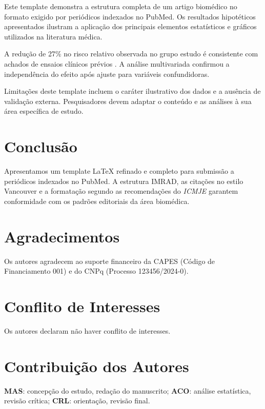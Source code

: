 \documentclass[12pt,a4paper]{article}
\newcommand{\ICMJE}{\textit{ICMJE}}
\begin{document}
Este template demonstra a estrutura completa de um artigo
biom\'edico no formato exigido por peri\'odicos indexados no
PubMed. Os resultados hipot\'eticos apresentados ilustram a
aplica\c{c}\~ao dos principais elementos estat\'isticos e
gr\'aficos utilizados na literatura m\'edica.

A redu\c{c}\~ao de 27\% no risco relativo observada no grupo
estudo \'e consistente com achados de ensaios cl\'inicos
pr\'evios \cite{Topol2024Preventive}. A an\'alise multivariada
confirmou a independ\^encia do efeito ap\'os ajuste para
vari\'aveis confundidoras.

Limita\c{c}\~oes deste template incluem o car\'ater ilustrativo
dos dados e a aus\^encia de valida\c{c}\~ao externa.
Pesquisadores devem adaptar o conte\'udo e as an\'alises
\`a sua \'area espec\'ifica de estudo.

\section{Conclus\~ao}
\label{sec:conclusao}

Apresentamos um template \LaTeX{} refinado e completo para
submiss\~ao a peri\'odicos indexados no PubMed. A estrutura
IMRAD, as cita\c{c}\~oes no estilo Vancouver e a formata\c{c}\~ao
segundo as recomenda\c{c}\~oes do \ICMJE{} garantem conformidade
com os padr\~oes editoriais da \'area biom\'edica.

\section*{Agradecimentos}
Os autores agradecem ao suporte financeiro da CAPES
(C\'odigo de Financiamento 001) e do CNPq (Processo
123456/2024-0).

\section*{Conflito de Interesses}
Os autores declaram n\~ao haver conflito de interesses.

\section*{Contribui\c{c}\~ao dos Autores}
\textbf{MAS}: concep\c{c}\~ao do estudo, reda\c{c}\~ao do manuscrito;
\textbf{ACO}: an\'alise estat\'istica, revis\~ao cr\'itica;
\textbf{CRL}: orienta\c{c}\~ao, revis\~ao final.
\end{document}
